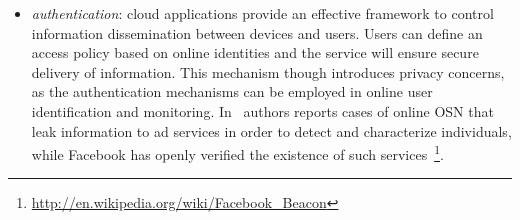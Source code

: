 \begin{itemize}
  \item{\it authentication}: cloud applications provide an effective
       framework to control information dissemination between devices and
       users.  Users can define an access policy based on online identities 
       and the service will ensure secure delivery of information.  This
       mechanism though introduces privacy concerns, as the authentication
       mechanisms can be employed in online user identification and monitoring. 
       In~\cite{Krishnamurthy2009} authors reports cases of online OSN that leak
       information to ad services in order to detect and characterize
       individuals, while Facebook has openly verified the existence of such
       services~\footnote{\url{http://en.wikipedia.org/wiki/Facebook_Beacon}}. 



\end{itemize}
